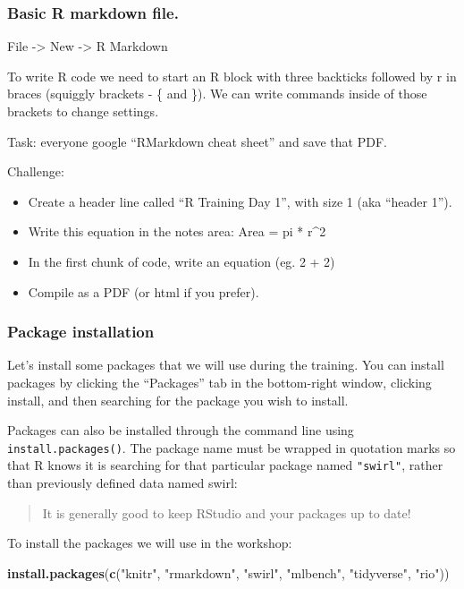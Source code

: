 \documentclass[]{article}
\newenvironment{Shaded}{\begin{snugshade}}{\end{snugshade}}
\newcommand{\KeywordTok}[1]{\textcolor[rgb]{0.13,0.29,0.53}{\textbf{#1}}}
\newcommand{\StringTok}[1]{\textcolor[rgb]{0.31,0.60,0.02}{#1}}
\newcommand{\NormalTok}[1]{#1}
\providecommand{\tightlist}{%
  \setlength{\itemsep}{0pt}\setlength{\parskip}{0pt}}
\begin{document}
\subsubsection{Basic R markdown file.}\label{basic-r-markdown-file.}

File -\textgreater{} New -\textgreater{} R Markdown

To write R code we need to start an R block with three backticks
followed by r in braces (squiggly brackets - \{ and \}). We can write
commands inside of those brackets to change settings.

Task: everyone google ``RMarkdown cheat sheet'' and save that PDF.

Challenge:

\begin{itemize}
\tightlist
\item
  Create a header line called ``R Training Day 1'', with size 1 (aka
  ``header 1'').
\item
  Write this equation in the notes area: Area = pi * r\^{}2
\item
  In the first chunk of code, write an equation (eg. 2 + 2)
\item
  Compile as a PDF (or html if you prefer).
\end{itemize}

\subsubsection{Package installation}\label{package-installation}

Let's install some packages that we will use during the training. You
can install packages by clicking the ``Packages'' tab in the
bottom-right window, clicking install, and then searching for the
package you wish to install.

Packages can also be installed through the command line using
\texttt{install.packages()}. The package name must be wrapped in
quotation marks so that R knows it is searching for that particular
package named \texttt{"swirl"}, rather than previously defined data
named swirl:

\begin{quote}
It is generally good to keep RStudio and your packages up to date!
\end{quote}

To install the packages we will use in the workshop:

\begin{Shaded}
\begin{Highlighting}[]
\KeywordTok{install.packages}\NormalTok{(}\KeywordTok{c}\NormalTok{(}\StringTok{"knitr"}\NormalTok{, }\StringTok{"rmarkdown"}\NormalTok{, }\StringTok{"swirl"}\NormalTok{, }\StringTok{"mlbench"}\NormalTok{, }\StringTok{"tidyverse"}\NormalTok{, }\StringTok{"rio"}\NormalTok{))}
\end{Highlighting}
\end{Shaded}
\end{document}

